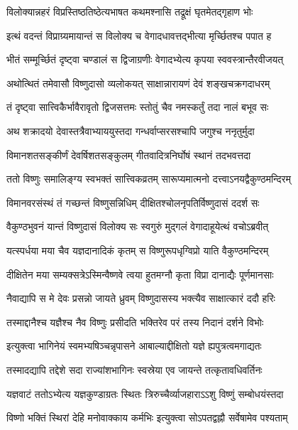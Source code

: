 \twolineshloka
{विलोक्यान्नहरं विप्रस्तिष्ठतिष्ठेत्यभाषत}
{कथमश्नासि तद्रूक्षं घृतमेतद्गृहाण भोः} %

\twolineshloka
{इत्थं वदन्तं विप्राग्र्यमायान्तं स विलोक्य च}
{वेगादधावत्तद्भीत्या मृर्च्छितश्च पपात ह} %

\twolineshloka
{भीतं सम्मूर्च्छितं दृष्ट्वा चण्डालं स द्विजाग्रणीः}
{वेगादभ्येत्य कृपया स्ववस्त्रान्तैरवीजयत्} %

\twolineshloka
{अथोत्थितं तमेवासौ विष्णुदासो व्यलोकयत्}
{साक्षान्नारायणं देवं शङ्खचक्रगदाधरम्} %

\twolineshloka
{तं दृष्ट्वा सात्त्विकैर्भावैरावृतो द्विजसत्तमः}
{स्तोतुं चैव नमस्कर्तुं तदा नालं बभूव सः} %

\twolineshloka
{अथ शक्रादयो देवास्तत्रैवाभ्याययुस्तदा}
{गन्धर्वाप्सरसश्चापि जगुश्च ननृतुर्मुदा} %

\twolineshloka
{विमानशतसङ्कीर्णं देवर्षिशतसङ्कुलम्}
{गीतवादित्रनिर्घोषं स्थानं तदभवत्तदा} %

\twolineshloka
{ततो विष्णुः समालिङ्ग्य स्वभक्तं सात्त्विकव्रतम्}
{सारूप्यमात्मनो दत्त्वाऽनयद्वैकुण्ठमन्दिरम्} %

\twolineshloka
{विमानवरसंस्थं तं गच्छन्तं विष्णुसन्निधिम्}
{दीक्षितश्चोलनृपतिर्विष्णुदासं ददर्श सः} %

\twolineshloka
{वैकुण्ठभुवनं यान्तं विष्णुदासं विलोक्य सः}
{स्वगुरुं मुद्गलं वेगादाहूयेत्थं वचोऽब्रवीत्} %


\twolineshloka
{यत्स्पर्धया मया चैव यज्ञदानादिकं कृतम्}
{स विष्णुरूपधृग्विप्रो याति वैकुण्ठमन्दिरम्} %

\twolineshloka
{दीक्षितेन मया सम्यक्सत्रेऽस्मिन्वैष्णवे त्वया}
{हुतमग्नौ कृता विप्रा दानाद्यैः पूर्णमानसाः} %

\twolineshloka
{नैवाद्यापि स मे देवः प्रसन्नो जायते ध्रुवम्}
{विष्णुदासस्य भक्त्यैव साक्षात्कारं ददौ हरिः} %

\twolineshloka
{तस्माद्दानैश्च यज्ञैश्च नैव विष्णुः प्रसीदति}
{भक्तिरेव परं तस्य निदानं दर्शने विभोः} %


\twolineshloka
{इत्युक्त्वा भागिनेयं स्वमभ्यषिञ्चन्नृपासने}
{आबाल्याद्दीक्षितो यज्ञे ह्यपुत्रत्वमगाद्यतः} %


\twolineshloka
{तस्मादद्यापि तद्देशे सदा राज्यांशभागिनः}
{स्वस्रेया एव जायन्ते तत्कृतावधिवर्तिनः} %

\twolineshloka
{यज्ञवाटं ततोऽभ्येत्य यज्ञकुण्डाग्रतः स्थितः}
{त्रिरुच्चैर्व्याजहाराऽऽशु विष्णुं सम्बोधयंस्तदा} %

\twolineshloka
{विष्णो भक्तिं स्थिरां देहि मनोवाक्काय कर्मभिः}
{इत्युक्त्वा सोऽपतद्वह्नौ सर्वेषामेव पश्यताम्} %

